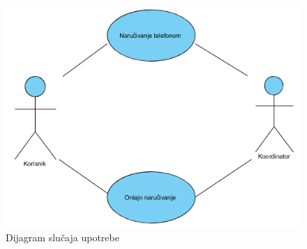 \begin{figure}[ht]
    \leavevmode
    \begin{center}
    \includegraphics[height=0.4\textheight]{slike/Upravljanje_porudzbinomUC.png}
    \end{center}
    \caption{Dijagram slučaja upotrebe}
\end{figure}


\newpage

